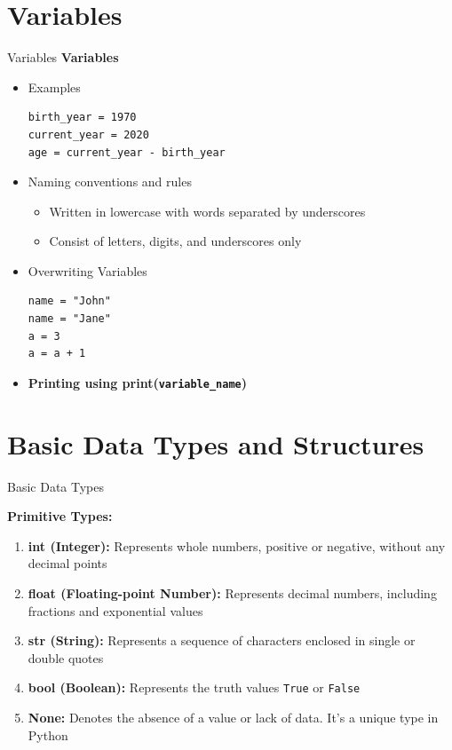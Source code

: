 \documentclass[
	11pt, 
]{beamer}
\begin{document}
\section{Variables}
\begin{frame}[fragile]{Variables}
    \textbf{Variables} \smallskip
    \begin{itemize}
        \item Examples \smallskip
            \begin{verbatim}
birth_year = 1970
current_year = 2020
age = current_year - birth_year
            \end{verbatim}\smallskip
        \item Naming conventions and rules \smallskip
            \begin{itemize}
                \item Written in lowercase with words separated by underscores \smallskip
                \item Consist of letters, digits, and underscores only
            \end{itemize}

   \item Overwriting Variables \smallskip
    \begin{verbatim}
name = "John"
name = "Jane"
a = 3
a = a + 1
    \end{verbatim}

    \item \textbf{Printing using print(\texttt{variable\_name})}
    \end{itemize}
\end{frame}


\section{Basic Data Types and Structures}
\begin{frame}{Basic Data Types}

\textbf{Primitive Types:} \bigskip
    \begin{enumerate}
        \item \textbf{int (Integer):} Represents whole numbers, positive or negative, without any decimal points \smallskip
        \item \textbf{float (Floating-point Number):} Represents decimal numbers, including fractions and exponential values \smallskip
        \item \textbf{str (String):} Represents a sequence of characters enclosed in single or double quotes \smallskip
        \item \textbf{bool (Boolean):} Represents the truth values \texttt{True} or \texttt{False} \smallskip
        \item \textbf{None:} Denotes the absence of a value or lack of data. It's a unique type in Python \smallskip
    \end{enumerate}
\end{frame}
\end{document}
